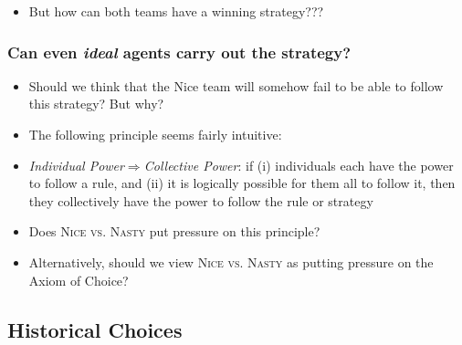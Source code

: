 \begin{frame}
\begin{itemize}[<+->]

\item But how can both teams have a winning strategy??? 


\end{itemize}
\end{frame}

\begin{frame}
\frametitle{Can even \textit{ideal} agents carry out the strategy?}

\begin{itemize}[<+->]

\item Should we think that the Nice team will somehow fail to be able to follow this strategy? But why? 

\item The following principle seems fairly intuitive: 
\item \emph{Individual Power}$\Rightarrow$\emph{Collective Power}: if (i) individuals each have the power to follow a rule, and (ii) it is logically possible for them all to follow it, then they collectively have the power to follow the rule or strategy 

\item Does \textsc{Nice vs. Nasty} put pressure on this principle?

\item Alternatively, should we view \textsc{Nice vs. Nasty} as putting pressure on the Axiom of Choice? 


\end{itemize}
\end{frame}



\fi%

\subsection{Historical Choices}

